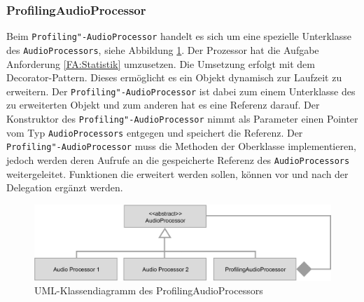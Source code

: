 \FloatBarrier




\subsubsection{ProfilingAudioProcessor}
Beim \texttt{Profiling"-AudioProcessor} handelt es sich um eine spezielle Unterklasse des \texttt{AudioProcessors}, siehe Abbildung \ref{Fig:ProfilingAudioProcessor}. Der Prozessor hat die Aufgabe Anforderung \ref{FA:Statistik} umzusetzen. Die Umsetzung erfolgt mit dem Decorator-Pattern. Dieses ermöglicht es ein Objekt dynamisch zur Laufzeit zu erweitern. Der \texttt{Profiling"-AudioProcessor} ist dabei zum einem Unterklasse des zu erweiterten Objekt und zum anderen hat es eine Referenz darauf. Der Konstruktor des \texttt{Profiling"-AudioProcessor} nimmt als Parameter einen Pointer vom Typ \texttt{AudioProcessors} entgegen und speichert die Referenz. Der \texttt{Profiling"-AudioProcessor} muss die Methoden der Oberklasse implementieren, jedoch werden deren Aufrufe an die gespeicherte Referenz des \texttt{AudioProcessors} weitergeleitet. Funktionen die erweitert werden sollen, können vor und nach der Delegation ergänzt werden.
\newline
\begin{figure}[htp]
\centering
\includegraphics[width=1\textwidth]{../img/ProfilingAudioProcessor}
\caption{UML-Klassendiagramm des ProfilingAudioProcessors}
\label{Fig:ProfilingAudioProcessor}
\end{figure}

\FloatBarrier

